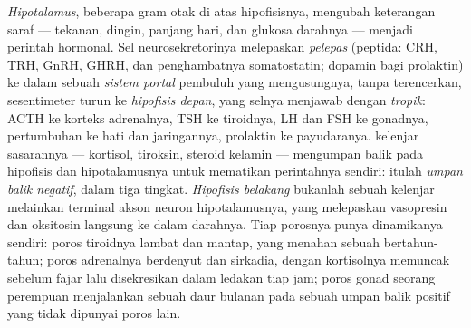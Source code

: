 \begin{definition}[Porosnya]\label{def:b3:endocrinology:axes}
%
\emph{Hipotalamus}, beberapa gram otak di atas hipofisisnya,
mengubah keterangan saraf --- tekanan, dingin, panjang hari,  dan
glukosa darahnya --- menjadi perintah hormonal. Sel
neurosekretorinya melepaskan \emph{ pelepas} (peptida:
CRH, TRH, GnRH, GHRH, dan penghambatnya somatostatin; dopamin bagi
prolaktin) ke dalam sebuah \emph{sistem portal} pembuluh yang
mengusungnya, tanpa terencerkan, sesentimeter turun ke \emph{hipofisis
depan}, yang selnya menjawab dengan \emph{ tropik}: ACTH ke
korteks adrenalnya, TSH ke tiroidnya, LH dan FSH ke gonadnya,
 pertumbuhan ke hati dan jaringannya, prolaktin ke payudaranya. 
kelenjar sasarannya --- kortisol, tiroksin, steroid kelamin ---
mengumpan balik pada hipofisis dan hipotalamusnya untuk mematikan perintahnya
sendiri: itulah \emph{umpan balik negatif}, dalam tiga tingkat.
\emph{Hipofisis belakang} bukanlah sebuah kelenjar melainkan terminal akson
neuron hipotalamusnya, yang melepaskan vasopresin dan oksitosin langsung ke dalam
darahnya. Tiap porosnya punya dinamikanya sendiri: poros tiroidnya lambat
dan mantap, yang menahan sebuah  bertahun-tahun; poros adrenalnya
berdenyut dan sirkadia, dengan kortisolnya memuncak sebelum fajar lalu disekresikan dalam
ledakan tiap jam; poros gonad seorang perempuan menjalankan sebuah daur bulanan pada
sebuah umpan balik positif yang tidak dipunyai poros lain.
\end{definition}

